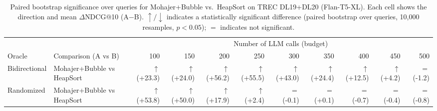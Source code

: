 \documentclass{llmxive}
\begin{document}
\begin{table}[!htbp]
\centering
\scriptsize
\begin{adjustbox}{max width=\linewidth}
\begin{tabular}{llrrrrrrrrr}
\toprule
& & \multicolumn{9}{c}{Number of LLM calls (budget)} \\
\cmidrule(lr){3-11}
Oracle & Comparison (A vs B) & 100 & 150 & 200 & 250 & 300 & 350 & 400 & 450 & 500 \\
\midrule
Bidirectional & Mohajer+Bubble vs HeapSort & $\uparrow$ (+23.3) & $\uparrow$ (+24.0) & $\uparrow$ (+56.2) & $\uparrow$ (+55.5) & $\uparrow$ (+43.0) & $\uparrow$ (+24.4) & $\uparrow$ (+12.5) & $\uparrow$ (+4.2) & $=$ (-1.2) \\
Randomized    & Mohajer+Bubble vs HeapSort & $\uparrow$ (+53.8) & $\uparrow$ (+50.0) & $\uparrow$ (+17.9) & $\uparrow$ (+2.4) & $=$ (-0.1) & $=$ (+0.1) & $=$ (-0.7) & $=$ (-0.4) & $=$ (-0.8) \\
\bottomrule
\end{tabular}
\end{adjustbox}
\caption{Paired bootstrap significance over queries for Mohajer+Bubble vs.\ HeapSort on TREC DL19+DL20 (Flan-T5-XL). Each cell shows the direction and mean $\Delta$NDCG@10 (A$-$B). $\uparrow/\downarrow$ indicates a statistically significant difference (paired bootstrap over queries, 10,000 resamples, $p < 0.05$); $=$ indicates not significant.}
\label{tab:sig_vs_heapsort}
\end{table}


\FloatBarrier
\end{document}
